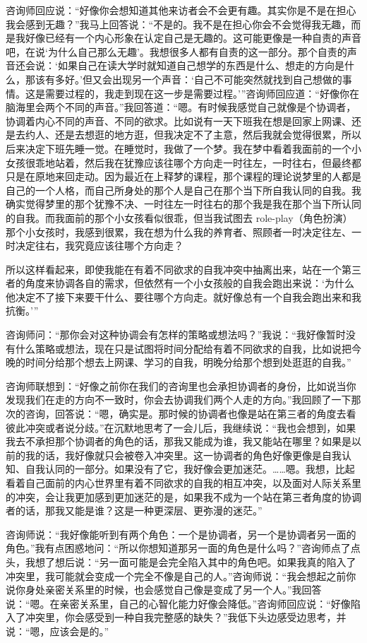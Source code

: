 咨询师回应说：“好像你会想知道其他来访者会不会更有趣。其实你是不是在担心我会感到无趣？”我马上回答说：“不是的。我不是在担心你会不会觉得我无趣，而是我好像已经有一个内心形象在认定自己是无趣的。这可能更像是一种自责的声音吧，在说‘为什么自己那么无趣’。我想很多人都有自责的这一部分。那个自责的声音还会说：‘如果自己在读大学时就知道自己想学的东西是什么、想走的方向是什么，那该有多好。’但又会出现另一个声音：‘自己不可能突然就找到自己想做的事情。这是需要过程的，我走到现在这一步是需要过程。’”咨询师回应道：“好像你在脑海里会两个不同的声音。”我回答道：“嗯。有时候我感觉自己就像是个协调者，协调着内心不同的声音、不同的欲求。比如说有一天下班我在想是回家上网课、还是去约人、还是去想逛的地方逛，但我决定不了主意，然后我就会觉得很累，所以后来决定下班先睡一觉。在睡觉时，我做了一个梦。我在梦中看着我面前的一个小女孩很乖地站着，然后我在犹豫应该往哪个方向走\pozhehao{}一时往左，一时往右，但最终都只是在原地来回走动。因为最近在上释梦的课程，那个课程的理论说梦里的人都是自己的一个人格，而自己所身处的那个人是自己在那个当下所自我认同的自我。我确实觉得梦里的那个犹豫不决、一时往左一时往右的那个我是我在那个当下所认同的自我。而我面前的那个小女孩看似很乖，但当我试图去 role-play（角色扮演）那个小女孩时，我感到很累，我在想为什么我的养育者、照顾者一时决定往左、一时决定往右，我究竟应该往哪个方向走？

所以这样看起来，即使我能在有着不同欲求的自我冲突中抽离出来，站在一个第三者的角度来协调各自的需求，但依然有一个小女孩般的自我会跑出来说：‘为什么他决定不了接下来要干什么、要往哪个方向走。就好像总有一个自我会跑出来和我抗衡。’”

咨询师问：“那你会对这种协调会有怎样的策略或想法吗？”我说：“我好像暂时没有什么策略或想法，现在只是试图将时间分配给有着不同欲求的自我，比如说把今晚的时间分给那个想去上网课、学习的自我，明晚分给那个想到处逛逛的自我。”

咨询师联想到：“好像之前你在我们的咨询里也会承担协调者的身份，比如说当你发现我们在走的方向不一致时，你会去协调我们两个人走的方向。”我回顾了一下那次的咨询，回答说：“嗯，确实是。那时候的协调者也像是站在第三者的角度去看彼此冲突或者说分歧。”在沉默地思考了一会儿后，我继续说：“我也会想到，如果我去不承担那个协调者的角色的话，那我又能成为谁，我又能站在哪里？如果是以前的我的话，我好像就只会被卷入冲突里。这一协调者的角色好像更像是自我认知、自我认同的一部分。如果没有了它，我好像会更加迷茫。……嗯。我想，比起看着自己面前的内心世界里有着不同欲求的自我的相互冲突，以及面对人际关系里的冲突，会让我更加感到更加迷茫的是，如果我不成为一个站在第三者角度的协调者的话，那我又能是谁？这是一种更深层、更弥漫的迷茫。”

咨询师说：“我好像能听到有两个角色：一个是协调者，另一个是协调者另一面的角色。”我有点困惑地问：“所以你想知道那另一面的角色是什么吗？”咨询师点了点头，我想了想后说：“另一面可能是会完全陷入其中的角色吧。如果我真的陷入了冲突里，我可能就会变成一个完全不像是自己的人。”咨询师说：“我会想起之前你说你身处亲密关系里的时候，也会感觉自己像是变成了另一个人。”我回答说：“嗯。在亲密关系里，自己的心智化能力好像会降低。”咨询师回应说：“好像陷入了冲突里，你会感受到一种自我完整感的缺失？”我低下头边感受边思考，并说：“嗯，应该会是的。”

